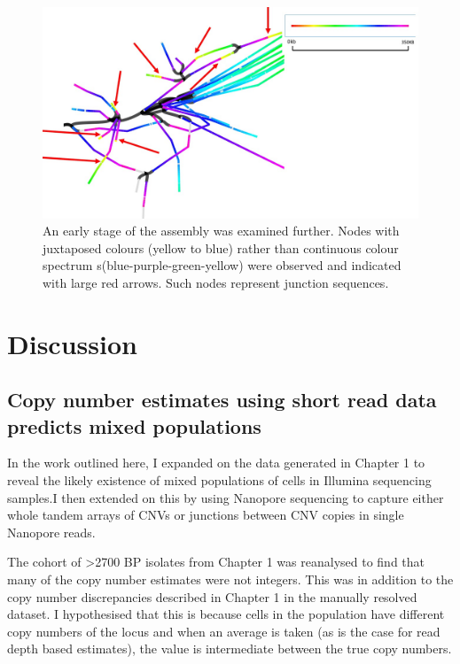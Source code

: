 \documentclass{article}
\begin{document}
\begin{figure}[h!]
\centering
\includegraphics[width=\textwidth{}]{Chapter_2/labelled mid-assembly ting.jpg}
\caption{An early stage of the assembly was examined further. Nodes with juxtaposed colours (yellow to blue) rather than continuous colour spectrum s(blue-purple-green-yellow) were observed and indicated with large red arrows. Such nodes represent junction sequences.}
\label{fig:MDR_Man_PC3}
\end{figure}



\section{Discussion}
 
\subsection{Copy number estimates using short read data predicts mixed populations}


In the work outlined here, I expanded on the data generated in Chapter 1 to reveal the likely existence of mixed populations of cells in Illumina sequencing samples.I then  extended on this by using Nanopore sequencing to capture either whole tandem arrays of CNVs or junctions between CNV copies in single Nanopore reads.


The cohort of >2700 BP isolates from Chapter 1 was reanalysed to find that many of the copy number estimates were not integers. This was in addition to the copy number discrepancies described in Chapter 1 in the manually resolved dataset. I hypothesised that this is because cells in the population have different copy numbers of the locus and when an average is taken (as is the case for read depth based estimates), the value is intermediate between the true copy numbers.
\end{document}
